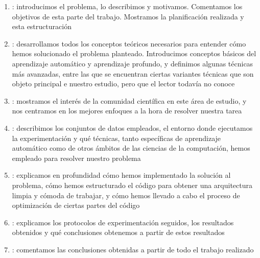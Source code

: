 \begin{enumerate}
    \item {}: introducimos el problema, lo describimos y motivamos. Comentamos los objetivos de esta parte del trabajo. Mostramos la planificación realizada y esta estructuración
    \item {}: desarrollamos todos los conceptos teóricos necesarios para entender cómo hemos solucionado el problema planteado. Introducimos conceptos básicos del aprendizaje automático y aprendizaje profundo, y definimos algunas técnicas más avanzadas, entre las que se encuentran ciertas variantes técnicas que son objeto principal e nuestro estudio, pero que el lector todavía no conoce
    \item {}: mostramos el interés de la comunidad científica en este área de estudio, y nos centramos en los mejores enfoques a la hora de resolver nuestra tarea
    \item {}: describimos los conjuntos de datos empleados, el entorno donde ejecutamos la experimentación y qué técnicas, tanto específicas de aprendizaje automático como de otros ámbitos de las ciencias de la computación, hemos empleado para resolver nuestro problema
    \item {}: explicamos en profundidad cómo hemos implementado la solución al problema, cómo hemos estructurado el código para obtener una arquitectura limpia y cómoda de trabajar, y cómo hemos llevado a cabo el proceso de optimización de ciertas partes del código
    \item {}: explicamos los protocolos de experimentación seguidos, los resultados obtenidos y qué conclusiones obtenemos a partir de estos resultados
    \item {}: comentamos las conclusiones obtenidas a partir de todo el trabajo realizado
\end{enumerate}
